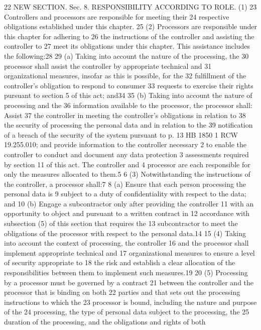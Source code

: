 22 NEW SECTION. Sec. 8. RESPONSIBILITY ACCORDING TO ROLE. (1)
23 Controllers and processors are responsible for meeting their
24 respective obligations established under this chapter.
25 (2) Processors are responsible under this chapter for adhering to
26 the instructions of the controller and assisting the controller to
27 meet its obligations under this chapter. This assistance includes the
following:28
29 (a) Taking into account the nature of the processing, the
30 processor shall assist the controller by appropriate technical and
31 organizational measures, insofar as this is possible, for the
32 fulfillment of the controller's obligation to respond to consumer
33 requests to exercise their rights pursuant to section 5 of this act;
and34
35 (b) Taking into account the nature of processing and the
36 information available to the processor, the processor shall: Assist
37 the controller in meeting the controller's obligations in relation to
38 the security of processing the personal data and in relation to the
39 notification of a breach of the security of the system pursuant to
p. 13 HB 1850
1 RCW 19.255.010; and provide information to the controller necessary
2 to enable the controller to conduct and document any data protection
3 assessments required by section 11 of this act. The controller and
4 processor are each responsible for only the measures allocated to
them.5
6 (3) Notwithstanding the instructions of the controller, a
processor shall:7
8 (a) Ensure that each person processing the personal data is
9 subject to a duty of confidentiality with respect to the data; and
10 (b) Engage a subcontractor only after providing the controller
11 with an opportunity to object and pursuant to a written contract in
12 accordance with subsection (5) of this section that requires the
13 subcontractor to meet the obligations of the processor with respect
to the personal data.14
15 (4) Taking into account the context of processing, the controller
16 and the processor shall implement appropriate technical and
17 organizational measures to ensure a level of security appropriate to
18 the risk and establish a clear allocation of the responsibilities
between them to implement such measures.19
20 (5) Processing by a processor must be governed by a contract
21 between the controller and the processor that is binding on both
22 parties and that sets out the processing instructions to which the
23 processor is bound, including the nature and purpose of the
24 processing, the type of personal data subject to the processing, the
25 duration of the processing, and the obligations and rights of both
